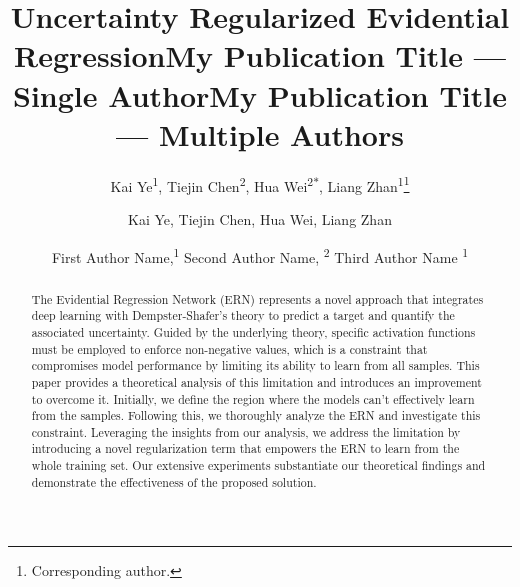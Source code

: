 \documentclass[letterpaper]{article} %
\title{Uncertainty Regularized Evidential Regression}
\author{
    Kai Ye\textsuperscript{\rm 1}, Tiejin Chen\textsuperscript{\rm 2}, Hua Wei\textsuperscript{\rm 2$*$}, Liang Zhan\textsuperscript{\rm 1}\thanks{Corresponding author.}
}
\title{My Publication Title --- Single Author}
\author {
    Kai Ye, Tiejin Chen, Hua Wei, Liang Zhan
}
\title{My Publication Title --- Multiple Authors}
\author {
    First Author Name,\textsuperscript{\rm 1}
    Second Author Name, \textsuperscript{\rm 2}
    Third Author Name \textsuperscript{\rm 1}
}
\theoremstyle{definition}
\begin{document}
\maketitle

\begin{abstract}
The Evidential Regression Network (ERN) represents a novel approach that integrates deep learning with Dempster-Shafer's theory to predict a target and quantify the associated uncertainty. Guided by the underlying theory, specific activation functions must be employed to enforce non-negative values, which is a constraint that compromises model performance by limiting its ability to learn from all samples. This paper provides a theoretical analysis of this limitation and introduces an improvement to overcome it. Initially, we define the region where the models can't effectively learn from the samples. Following this, we thoroughly analyze the ERN and investigate this constraint. Leveraging the insights from our analysis, we address the limitation by introducing a novel regularization term that empowers the ERN to learn from the whole training set. Our extensive experiments substantiate our theoretical findings and demonstrate the effectiveness of the proposed solution.
\end{abstract}










\end{document}
